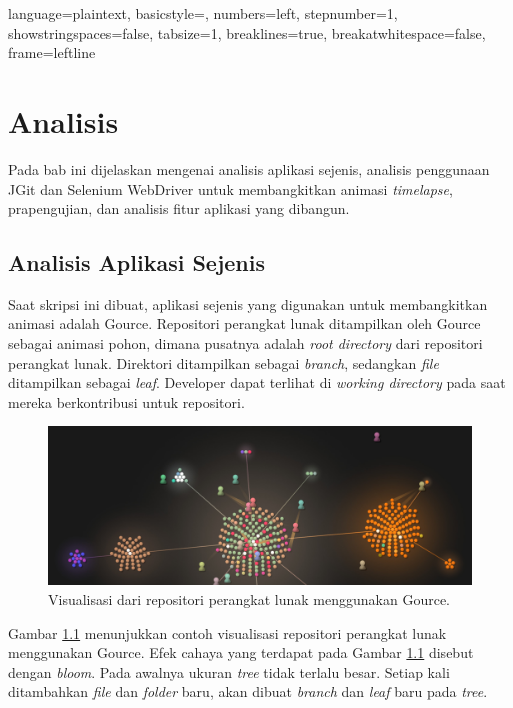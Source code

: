 
\lstset
{ 
     language=plaintext,
     basicstyle=\footnotesize,
     numbers=left,
     stepnumber=1,
     showstringspaces=false,
     tabsize=1,
     breaklines=true,
     breakatwhitespace=false,
     frame=leftline
}

\chapter{Analisis}
\label{chap:analisis}
Pada bab ini dijelaskan mengenai analisis aplikasi sejenis, analisis penggunaan JGit dan Selenium WebDriver untuk membangkitkan animasi \textit{timelapse}, prapengujian, dan analisis fitur aplikasi yang dibangun. 

\section{Analisis Aplikasi Sejenis}
\label{sec:analisis_aplikasi_sejenis}
Saat skripsi ini dibuat, aplikasi sejenis yang digunakan untuk membangkitkan animasi adalah Gource.  
Repositori perangkat lunak ditampilkan oleh Gource sebagai animasi pohon, dimana pusatnya adalah \textit{root directory} dari repositori perangkat lunak\cite{Gource}. Direktori ditampilkan sebagai \textit{branch}, sedangkan \textit{file} ditampilkan sebagai \textit{leaf}. Developer dapat terlihat di \textit{working directory} pada saat mereka berkontribusi untuk repositori.

\begin{figure}[H]
	\centering
		\includegraphics[scale=0.2]{Gambar/gource.jpg}
	\caption{Visualisasi dari repositori perangkat lunak menggunakan Gource.}
	\label{fig:gource}
\end{figure}

Gambar \ref{fig:gource} menunjukkan contoh visualisasi repositori perangkat lunak menggunakan Gource. Efek cahaya yang terdapat pada Gambar \ref{fig:gource} disebut dengan \textit{bloom}. Pada awalnya ukuran \textit{tree} tidak terlalu besar. Setiap kali ditambahkan \textit{file} dan \textit{folder} baru, akan dibuat \textit{branch} dan \textit{leaf} baru pada \textit{tree}.  


